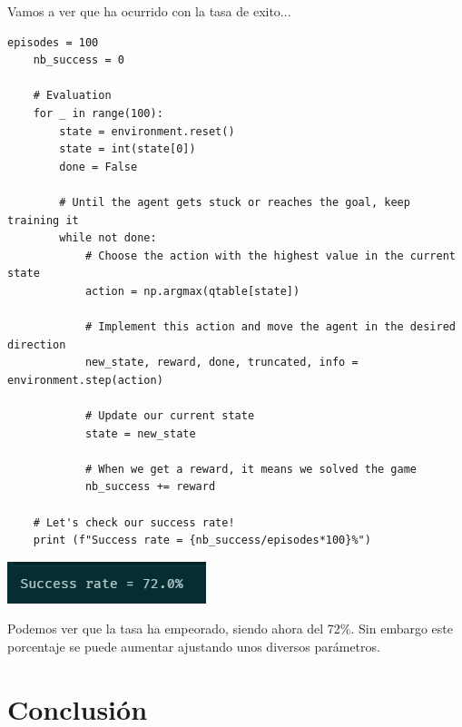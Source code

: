 \documentclass{article}
\begin{document}
\vspace{0.5cm}

Vamos a ver que ha ocurrido con la tasa de exito...

\vspace{0.5cm}

\begin{lstlisting}[style=mystyle]
    episodes = 100
    nb_success = 0
    
    # Evaluation
    for _ in range(100):
        state = environment.reset()
        state = int(state[0])
        done = False
        
        # Until the agent gets stuck or reaches the goal, keep training it
        while not done:
            # Choose the action with the highest value in the current state
            action = np.argmax(qtable[state])
    
            # Implement this action and move the agent in the desired direction
            new_state, reward, done, truncated, info = environment.step(action)
    
            # Update our current state
            state = new_state
    
            # When we get a reward, it means we solved the game
            nb_success += reward
    
    # Let's check our success rate!
    print (f"Success rate = {nb_success/episodes*100}%")
\end{lstlisting}

\vspace{0.5cm}

\begin{center}
    \includegraphics[width=0.75\linewidth]{resbaladizo_rate.png}
\end{center}

\vspace{0.5cm}

Podemos ver que la tasa ha empeorado, siendo ahora del 72\%. Sin embargo este porcentaje se puede aumentar ajustando unos diversos parámetros.

\vspace{1cm}

\section{Conclusión}
\end{document}

